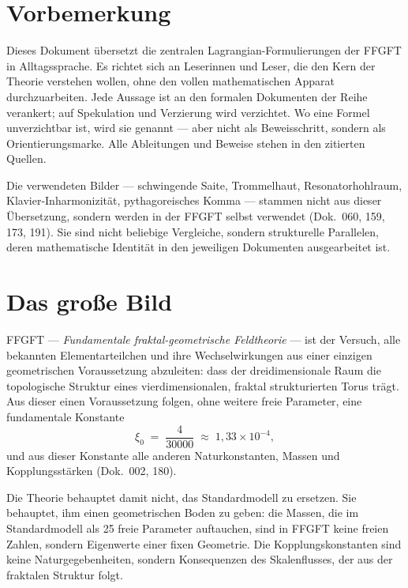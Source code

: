 
\section*{Vorbemerkung}

Dieses Dokument übersetzt die zentralen Lagrangian-Formulierungen
der FFGFT in Alltagssprache. Es richtet sich an Leserinnen und Leser,
die den Kern der Theorie verstehen wollen, ohne den vollen
mathematischen Apparat durchzuarbeiten. Jede Aussage ist an den
formalen Dokumenten der Reihe verankert; auf Spekulation und
Verzierung wird verzichtet. Wo eine Formel unverzichtbar ist, wird
sie genannt --- aber nicht als Beweisschritt, sondern als
Orientierungsmarke. Alle Ableitungen und Beweise stehen in den
zitierten Quellen.

Die verwendeten Bilder --- schwingende Saite, Trommelhaut,
Resonatorhohlraum, Klavier-Inharmonizität, pythagoreisches Komma ---
stammen nicht aus dieser Übersetzung, sondern werden in der FFGFT
selbst verwendet (Dok.~060, 159, 173, 191). Sie sind nicht beliebige
Vergleiche, sondern strukturelle Parallelen, deren mathematische
Identität in den jeweiligen Dokumenten ausgearbeitet ist.

\section{Das große Bild}

FFGFT --- \emph{Fundamentale fraktal-geometrische Feldtheorie} ---
ist der Versuch, alle bekannten Elementarteilchen und ihre
Wechselwirkungen aus einer einzigen geometrischen Voraussetzung
abzuleiten: dass der dreidimensionale Raum die topologische Struktur
eines vierdimensionalen, fraktal strukturierten Torus trägt. Aus
dieser einen Voraussetzung folgen, ohne weitere freie Parameter, eine
fundamentale Konstante
\[
  \xi_0 \;=\; \frac{4}{30000} \;\approx\; 1{,}33 \times 10^{-4},
\]
und aus dieser Konstante alle anderen Naturkonstanten, Massen und
Kopplungsstärken (Dok.~002, 180).

Die Theorie behauptet damit nicht, das Standardmodell zu ersetzen.
Sie behauptet, ihm einen geometrischen Boden zu geben: die Massen,
die im Standardmodell als 25 freie Parameter auftauchen, sind in
FFGFT keine freien Zahlen, sondern Eigenwerte einer fixen Geometrie.
Die Kopplungskonstanten sind keine Naturgegebenheiten, sondern
Konsequenzen des Skalenflusses, der aus der fraktalen Struktur folgt.


